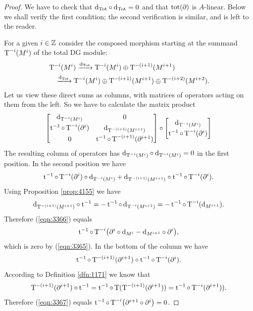 \begin{proof}
We have to check that 
$\mathrm{d}_{\mathrm{Tot}} \circ \mathrm{d}_{\mathrm{Tot}} = 0$
and that $\operatorname{tot}(\partial)$ is $A$-linear. 
Below we shall verify the first condition; the second verification is similar, 
and is left to the reader. 

For a given $i \in \mathbb{Z}$ consider the composed morphism starting at the summand
$\operatorname{T}^{-i}(M^i)$ of the total DG module:
\[ \begin{aligned}
&
\operatorname{T}^{-i}(M^i) \xrightarrow{\mathrm{d}_{\mathrm{Tot}}}
\operatorname{T}^{-i}(M^i) \oplus \operatorname{T}^{-(i + 1)}(M^{i + 1}) 
\\
& \quad 
\xrightarrow{\mathrm{d}_{\mathrm{Tot}}}
\operatorname{T}^{-i}(M^i) \oplus \operatorname{T}^{-(i + 1)}(M^{i + 1})
\oplus \operatorname{T}^{-(i + 2)}(M^{i + 2}) . 
\end{aligned} \]
Let us view these direct sums as columns, with matrices of operators acting on 
them from the left. So we have to calculate the matrix product 
\[ 
\begin{bmatrix}  \mathrm{d}_{\operatorname{T}^{-i}(M^i)} & 0
\\[0.3em]
\operatorname{t}^{-1} \circ \operatorname{T}^{-i}(\partial^i) & \mathrm{d}_{\operatorname{T}^{-(i + 1)}(M^{i + 1})}
\\[0.3em]
0 & \operatorname{t}^{-1} \circ \operatorname{T}^{-(i + 1)}(\partial^{i + 1})  \end{bmatrix}
\circ
\begin{bmatrix}  \mathrm{d}_{\operatorname{T}^{-i}(M^i)} 
\\[0.3em]
\operatorname{t}^{-1} \circ \operatorname{T}^{-i}(\partial^i)  \end{bmatrix} 
\]
The resulting column of operators has  
$\mathrm{d}_{\operatorname{T}^{-i}(M^i)} \circ \mathrm{d}_{\operatorname{T}^{-i}(M^i)} = 0$
in the first position. In the second position we have
\begin{equation} \label{eqn:3366}
\operatorname{t}^{-1} \circ \operatorname{T}^{-i}(\partial^i) \circ \mathrm{d}_{\operatorname{T}^{-i}(M^i)} +
\mathrm{d}_{\operatorname{T}^{-(i + 1)}(M^{i + 1})} \circ \operatorname{t}^{-1} 
\circ \operatorname{T}^{-i}(\partial^i) .
\end{equation}
Using Proposition \ref{prop:4155} we have 
\[ \mathrm{d}_{\operatorname{T}^{-(i + 1)}(M^{i + 1})} \circ  \operatorname{t}^{-1} = 
- \operatorname{t}^{-1} \circ \, \mathrm{d}_{\operatorname{T}^{-i}(M^{i + 1})} = 
- \operatorname{t}^{-1} \circ \operatorname{T}^{-i}(\mathrm{d}_{M^{i + 1}}) . \]
Therefore (\ref{eqn:3366}) equals 
\[ \operatorname{t}^{-1} \circ \operatorname{T}^{-i} \bigl( \partial^i \circ \mathrm{d}_{M^i} -
\mathrm{d}_{M^{i + 1}} \circ \partial^i \bigr) , \]
which is zero by (\ref{eqn:3365}). 
In the bottom of the column we have
\begin{equation} \label{eqn:3367}
\operatorname{t}^{-1} \circ \operatorname{T}^{-(i + 1)}(\partial^{i + 1}) \circ 
\operatorname{t}^{-1} \circ \operatorname{T}^{-i}(\partial^{i}) . 
\end{equation}
According to Definition \ref{dfn:1171} we know that 
\[ \operatorname{T}^{-(i + 1)}(\partial^{i + 1}) \circ \operatorname{t}^{-1} = 
\operatorname{t}^{-1} \circ \operatorname{T}(\operatorname{T}^{-(i + 1)}(\partial^{i + 1})) = 
\operatorname{t}^{-1} \circ \operatorname{T}^{-i}(\partial^{i + 1})) . \]
Therefore (\ref{eqn:3367}) equals 
$\operatorname{t}^{-1} \circ \operatorname{T}^{-i} \bigl( \partial^{i + 1} \circ \partial^{i} \bigr) = 0$. 
\end{proof}

